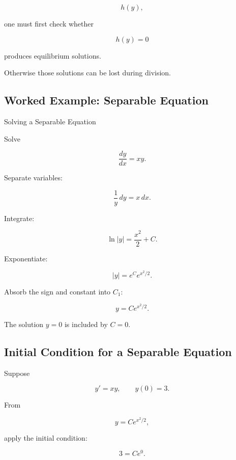 \[
h(y),
\]

one must first check whether

\[
\boxed{
h(y)=0
}
\]

produces equilibrium solutions.

Otherwise those solutions can be lost during division.

\subsection{Worked Example: Separable Equation}
\label{subsec:worked-separable-ode}

\begin{workedexamplebox}{Solving a Separable Equation}

Solve

\[
\frac{dy}{dx}
=
xy.
\]

Separate variables:

\[
\frac1y\,dy
=
x\,dx.
\]

Integrate:

\[
\ln|y|
=
\frac{x^2}{2}
+
C.
\]

Exponentiate:

\[
|y|
=
e^C
e^{x^2/2}.
\]

Absorb the sign and constant into \(C_1\):

\begin{answerbox}
\[
\boxed{
y
=
Ce^{x^2/2}.
}
\]
\end{answerbox}

The solution \(y=0\) is included by \(C=0\).

\end{workedexamplebox}

\subsection{Initial Condition for a Separable Equation}
\label{subsec:separable-ivp}

Suppose

\[
y'
=
xy,
\qquad
y(0)=3.
\]

From

\[
y
=
Ce^{x^2/2},
\]

apply the initial condition:

\[
3
=
Ce^0.
\]

